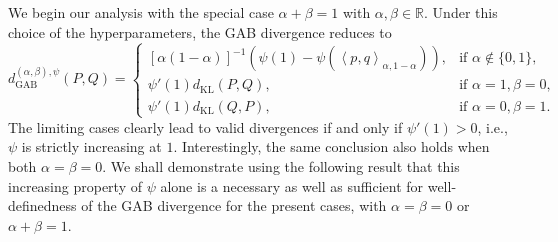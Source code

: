\documentclass[11pt]{article}
\theoremstyle{plain}
\newtheorem{theorem}{Theorem}[section]
\theoremstyle{remark}
\def\R{\mathbb{R}}
\newcommand{\dKL}{d_{\mathrm{KL}}}
\newcommand{\dGAB}{d_{\mathrm{GAB}}}
\newcommand{\inner}[1]{\left\langle #1\right\rangle}
\newcommand{\todo}[1]{\textcolor{red}{#1}}
\begin{document}
We begin our analysis with the special case $\alpha +\beta = 1$ with $\alpha, \beta \in \R$. Under this choice of the hyperparameters, the GAB divergence reduces to
\begin{equation*}
    \dGAB^{(\alpha,\beta),\psi}(P, Q)
    = \begin{cases}
        [\alpha(1-\alpha)]^{-1} \left( \psi(1) - \psi(\inner{p,q}_{\alpha, 1-\alpha}) \right), & \text{if } \alpha \notin \{ 0, 1 \}, \\
        \psi'(1) \dKL(P, Q),                                                                   & \text{if } \alpha = 1, \beta = 0,    \\
        \psi'(1) \dKL(Q, P),                                                                   & \text{if } \alpha = 0, \beta = 1.
    \end{cases}
\end{equation*}
\noindent The limiting cases clearly lead to valid divergences if and only if $\psi'(1) > 0$, i.e., $\psi$ is strictly increasing at $1$. Interestingly, the same conclusion also holds when both $\alpha = \beta = 0$. We shall demonstrate using the following result that this increasing property of $\psi$ alone is a necessary as well as sufficient for well-definedness of the GAB divergence for the present cases, with $\alpha = \beta = 0$ or $\alpha + \beta = 1$.

\end{document}
